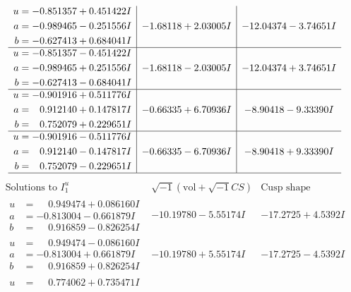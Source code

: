 \documentclass[1p]{elsarticle_modified}
\theoremstyle{definition}
\newcommand{\I}{\sqrt{-1}}
\begin{document}
$$\begin{array}{c|c|c}
\begin{aligned}
u &= -0.851357 + 0.451422 I \\
a &= -0.989465 - 0.251556 I \\
b &= -0.627413 + 0.684041 I\end{aligned}
 & -1.68118 + 2.03005 I & -12.04374 - 3.74651 I \\ \hline\begin{aligned}
u &= -0.851357 - 0.451422 I \\
a &= -0.989465 + 0.251556 I \\
b &= -0.627413 - 0.684041 I\end{aligned}
 & -1.68118 - 2.03005 I & -12.04374 + 3.74651 I \\ \hline\begin{aligned}
u &= -0.901916 + 0.511776 I \\
a &= \phantom{-}0.912140 + 0.147817 I \\
b &= \phantom{-}0.752079 + 0.229651 I\end{aligned}
 & -0.66335 + 6.70936 I & -8.90418 - 9.33390 I \\ \hline\begin{aligned}
u &= -0.901916 - 0.511776 I \\
a &= \phantom{-}0.912140 - 0.147817 I \\
b &= \phantom{-}0.752079 - 0.229651 I\end{aligned}
 & -0.66335 - 6.70936 I & -8.90418 + 9.33390 I\\
 \hline 
 \end{array}$$\newpage$$\begin{array}{c|c|c}  
\text{Solutions to }I^u_{1}& \I (\text{vol} + \sqrt{-1}CS) & \text{Cusp shape}\\
 \hline 
\begin{aligned}
u &= \phantom{-}0.949474 + 0.086160 I \\
a &= -0.813004 - 0.661879 I \\
b &= \phantom{-}0.916859 - 0.826254 I\end{aligned}
 & -10.19780 - 5.55174 I & -17.2725 + 4.5392 I \\ \hline\begin{aligned}
u &= \phantom{-}0.949474 - 0.086160 I \\
a &= -0.813004 + 0.661879 I \\
b &= \phantom{-}0.916859 + 0.826254 I\end{aligned}
 & -10.19780 + 5.55174 I & -17.2725 - 4.5392 I \\ \hline\begin{aligned}
u &= \phantom{-}0.774062 + 0.735471 I \\

\end{aligned}
\end{array}$$
\end{document}
